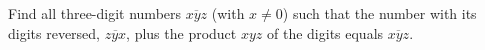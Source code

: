 Find all three-digit numbers $\overline{xyz}$ (with $x\ne0$) such that the number with its digits reversed, $\overline{zyx}$, plus the product $xyz$ of the digits equals $\overline{xyz}$.
